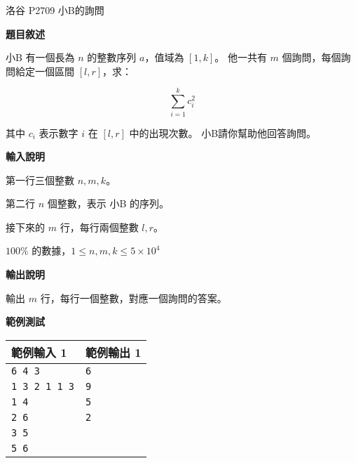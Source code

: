     \problem 洛谷 P2709 小B的詢問

    \textbf{題目敘述}

    小B 有一個長為 $n$ 的整數序列 $a$，值域為 $[1,k]$。
    他一共有 $m$ 個詢問，每個詢問給定一個區間 $[l,r]$，求：

    $$\sum\limits_{i=1}^k c_i^2$$

    其中 $c_i$ 表示數字 $i$ 在 $[l,r]$ 中的出現次數。
    小B請你幫助他回答詢問。

    \textbf{輸入說明}

    第一行三個整數 $n,m,k$。

    第二行 $n$ 個整數，表示 小B 的序列。

    接下來的 $m$ 行，每行兩個整數 $l,r$。

    $100\%$ 的數據，$1\le n,m,k \le 5\times 10^4$

    \textbf{輸出說明}

    輸出 $m$ 行，每行一個整數，對應一個詢問的答案。

    \textbf{範例測試}

    \begin{tabular}{|m{7cm}|m{7cm}|}
        \hline
        範例輸入 1 & 範例輸出 1 \\
        \hline
        \verb|6 4 3| & \verb|6| \\
        \verb|1 3 2 1 1 3| & \verb|9| \\
        \verb|1 4| & \verb|5| \\
        \verb|2 6| & \verb|2| \\
        \verb|3 5| & \\
        \verb|5 6| & \\
        \hline
    \end{tabular}